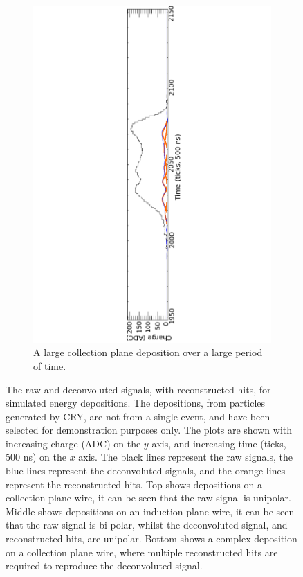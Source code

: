 \begin{figure}
\begin{subfigure}{0.95\textwidth}
    \includegraphics[width=\textwidth]{Complex}
    \caption{A large collection plane deposition over a large period of time.}
    \label{fig:LotsOfHits_Big}
  \end{subfigure}
  \caption[A selection of reconstructed hits, from simulated energy depositions]
          {The raw and deconvoluted signals, with reconstructed hits, for simulated energy depositions. The depositions, from particles generated by CRY, are not from a single event, and have been selected for demonstration purposes only. The plots are shown with increasing charge (ADC) on the $y$ axis, and increasing time (ticks, 500 ns) on the $x$ axis. The black lines represent the raw signals, the blue lines represent the deconvoluted signals, and the orange lines represent the reconstructed hits. Top shows depositions on a collection plane wire, it can be seen that the raw signal is unipolar. Middle shows depositions on an induction plane wire, it can be seen that the raw signal is bi-polar, whilst the deconvoluted signal, and reconstructed hits, are unipolar. Bottom shows a complex deposition on a collection plane wire, where multiple reconstructed hits are required to reproduce the deconvoluted signal.}
  \label{fig:LotsOfHits}
\end{figure}

